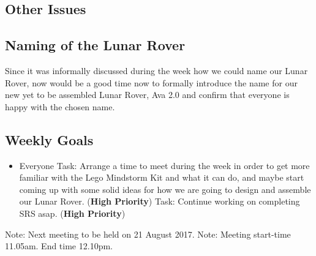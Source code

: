 \documentclass[11pt, a4paper]{article}
\begin{document}
\begin{flushleft}
  \section{Other Issues}
  \subsection{Naming of the Lunar Rover}
  Since it was informally discussed during the week how we could name our Lunar Rover, now would be a good time now to formally introduce the name for our new yet to be assembled Lunar Rover, Ava 2.0 and confirm that everyone is happy with the chosen name. 
  \subsection{Weekly Goals}
  \begin{itemize}
  \item Everyone
  \linebreak Task: Arrange a time to meet during the week in order to get more familiar with the Lego Mindstorm Kit and what it can do, and maybe start coming up with some solid ideas for how we are going to design and assemble our Lunar Rover. ({\bf High  Priority})
  \linebreak Task: Continue working on completing SRS asap. ({\bf High  Priority})
  \end{itemize}
  \vspace*{10pt}
  \noindent Note: Next meeting to be held on 21 August 2017.
  \noindent\linebreak Note: Meeting start-time 11.05am. End time 12.10pm.
  \end{flushleft}

  
\end{document}
